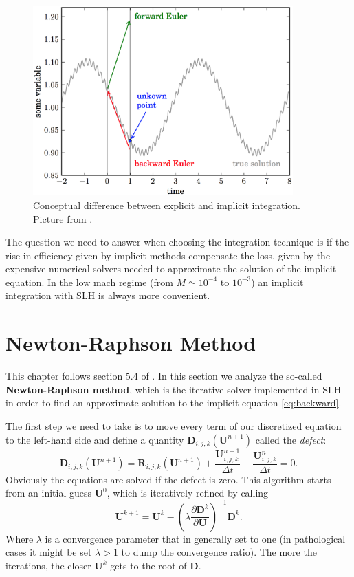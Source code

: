 \begin{figure}[t]
\centering
\includegraphics[width=10cm]{./img/implicit}
\caption{Conceptual difference between explicit and implicit integration. Picture from \citet{miczek}.}
\label{fig:implicit}
\centering
\end{figure}
The question we need to answer when choosing the integration technique is if the rise in efficiency given by implicit methods compensate the loss, given by the expensive numerical solvers needed to approximate the solution of the implicit equation. In the low mach regime (from $M \simeq 10^{-4}$ to $10^{-3}$) an implicit integration with SLH is always more convenient. 

\section{Newton-Raphson Method}
This chapter follows section 5.4 of \citet{miczek}.
In this section we analyze the so-called \textbf{Newton-Raphson method}, which is the iterative solver implemented in SLH in order to find an approximate solution to the implicit equation \ref{eq:backward}. 

The first step we need to take is to move every term of our discretized equation to the left-hand side and define a quantity $\mathbf{D}_{i, j, k}(\mathbf{U}^{n+1})$ called the \textit{defect}:
\begin{equation}\label{eq:defect}
	\mathbf{D}_{i, j, k}(\mathbf{U}^{n+1}) = \mathbf{R}_{i, j, k}(\mathbf{U}^{n+1}) + \frac{\mathbf{U}_{i, j, k}^{n+1}}{\Delta t} - \frac{\mathbf{U}^n_{i, j, k}}{\Delta t} = 0.
\end{equation}
Obviously the equations are solved if the defect is zero. This algorithm starts from an initial guess $\mathbf{U}^0$, which is iteratively refined by calling
\begin{equation}\label{eq:newtonraphson}
	\mathbf{U}^{k+1} = \mathbf{U}^k - \left( \lambda \frac{\partial \mathbf{D}^k}{\partial \mathbf{U}}  \right)^{-1} \mathbf{D}^k.
\end{equation}
Where $\lambda$ is a convergence parameter that in generally set to one (in pathological cases it might be set $\lambda > 1$ to dump the convergence ratio). The more the iterations, the closer $\mathbf{U}^k$ gets to the root of $\mathbf{D}$.

